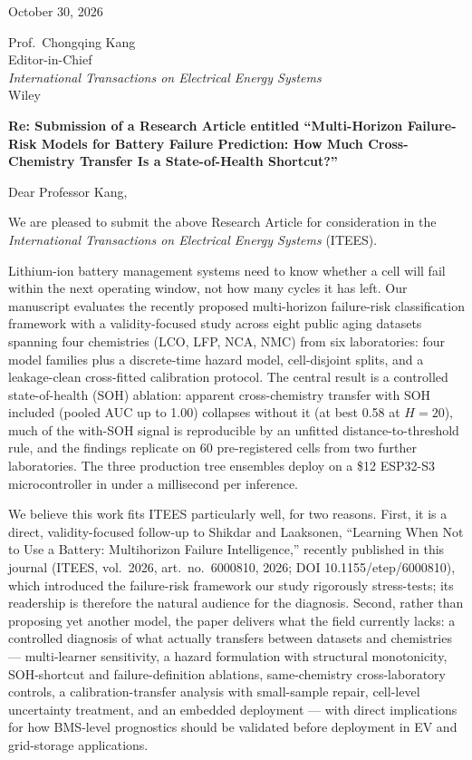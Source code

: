 \documentclass[11pt,a4paper]{article}
\begin{document}
\small
October 30, 2026

\medskip
Prof.\ Chongqing Kang\\
Editor-in-Chief\\
\textit{International Transactions on Electrical Energy Systems}\\
Wiley

\medskip
\textbf{Re: Submission of a Research Article entitled ``Multi-Horizon Failure-Risk Models for Battery Failure Prediction: How Much Cross-Chemistry Transfer Is a State-of-Health Shortcut?''}

\medskip
Dear Professor Kang,

We are pleased to submit the above Research Article for consideration in the \textit{International Transactions on Electrical Energy Systems} (ITEES).

Lithium-ion battery management systems need to know whether a cell will fail within the next operating window, not how many cycles it has left. Our manuscript evaluates the recently proposed multi-horizon failure-risk classification framework with a validity-focused study across eight public aging datasets spanning four chemistries (LCO, LFP, NCA, NMC) from six laboratories: four model families plus a discrete-time hazard model, cell-disjoint splits, and a leakage-clean cross-fitted calibration protocol. The central result is a controlled state-of-health (SOH) ablation: apparent cross-chemistry transfer with SOH included (pooled AUC up to 1.00) collapses without it (at best 0.58 at $H{=}20$), much of the with-SOH signal is reproducible by an unfitted distance-to-threshold rule, and the findings replicate on 60 pre-registered cells from two further laboratories. The three production tree ensembles deploy on a \$12 ESP32-S3 microcontroller in under a millisecond per inference.

We believe this work fits ITEES particularly well, for two reasons. First, it is a direct, validity-focused follow-up to Shikdar and Laaksonen, ``Learning When Not to Use a Battery: Multihorizon Failure Intelligence,'' recently published in this journal (ITEES, vol.\ 2026, art.\ no.\ 6000810, 2026; DOI 10.1155/etep/6000810), which introduced the failure-risk framework our study rigorously stress-tests; its readership is therefore the natural audience for the diagnosis. Second, rather than proposing yet another model, the paper delivers what the field currently lacks: a controlled diagnosis of what actually transfers between datasets and chemistries --- multi-learner sensitivity, a hazard formulation with structural monotonicity, SOH-shortcut and failure-definition ablations, same-chemistry cross-laboratory controls, a calibration-transfer analysis with small-sample repair, cell-level uncertainty treatment, and an embedded deployment --- with direct implications for how BMS-level prognostics should be validated before deployment in EV and grid-storage applications.
\end{document}
